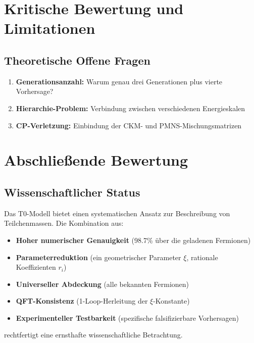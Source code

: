 	\section{Kritische Bewertung und Limitationen}
	\label{sec:kritische_bewertung}
	
	\subsection{Theoretische Offene Fragen}
	\label{subsec:offene_fragen}
	
	\begin{enumerate}
		\item \textbf{Generationsanzahl:} Warum genau drei Generationen plus vierte Vorhersage?
		\item \textbf{Hierarchie-Problem:} Verbindung zwischen verschiedenen Energieskalen
		\item \textbf{CP-Verletzung:} Einbindung der CKM- und PMNS-Mischungsmatrizen
	\end{enumerate}
	
	\section{Abschließende Bewertung}
	\label{sec:abschliessende_bewertung}
	
	\subsection{Wissenschaftlicher Status}
	\label{subsec:wissenschaftlicher_status}
	
	Das T0-Modell bietet einen systematischen Ansatz zur Beschreibung von Teilchenmassen. Die Kombination aus:
	
	\begin{itemize}
		\item \textbf{Hoher numerischer Genauigkeit} (98.7\% über die geladenen Fermionen)
		\item \textbf{Parameterreduktion} (ein geometrischer Parameter $\xi$, rationale Koeffizienten $r_i$)
		\item \textbf{Universeller Abdeckung} (alle bekannten Fermionen)
		\item \textbf{QFT-Konsistenz} (1-Loop-Herleitung der $\xi$-Konstante)
		\item \textbf{Experimenteller Testbarkeit} (spezifische falsifizierbare Vorhersagen)
	\end{itemize}
	
	rechtfertigt eine ernsthafte wissenschaftliche Betrachtung.
	
